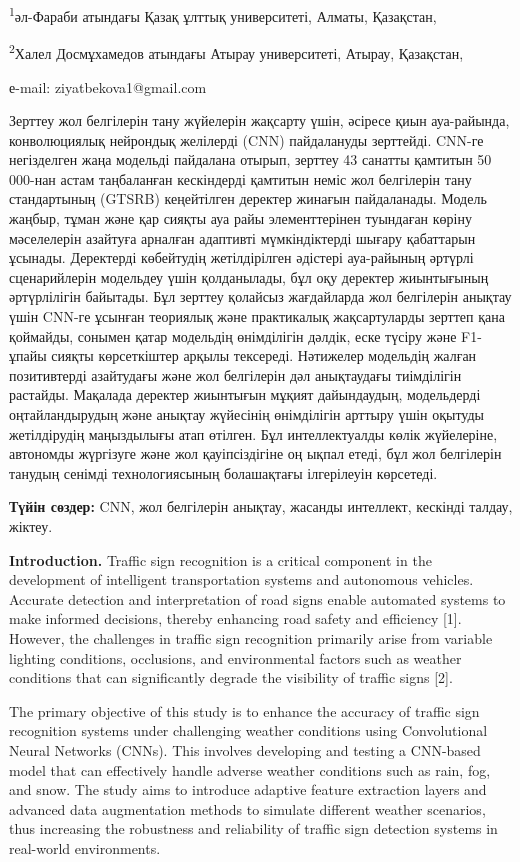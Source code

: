 \textsuperscript{1}әл-Фараби атындағы Қазақ ұлттық университеті, Алматы,
Қазақстан,

\textsuperscript{2}Халел Досмұхамедов атындағы Атырау университеті,
Атырау, Қазақстан,

е-mail: ziyatbekova1@gmail.com

Зерттеу жол белгілерін тану жүйелерін жақсарту үшін, әсіресе қиын
ауа-райында, конволюциялық нейрондық желілерді (CNN) пайдалануды
зерттейді. CNN-ге негізделген жаңа модельді пайдалана отырып, зерттеу 43
санатты қамтитын 50 000-нан астам таңбаланған кескіндерді қамтитын неміс
жол белгілерін тану стандартының (GTSRB) кеңейтілген деректер жинағын
пайдаланады. Модель жаңбыр, тұман және қар сияқты ауа райы
элементтерінен туындаған көріну мәселелерін азайтуға арналған адаптивті
мүмкіндіктерді шығару қабаттарын ұсынады. Деректерді көбейтудің
жетілдірілген әдістері ауа-райының әртүрлі сценарийлерін модельдеу үшін
қолданылады, бұл оқу деректер жиынтығының әртүрлілігін байытады. Бұл
зерттеу қолайсыз жағдайларда жол белгілерін анықтау үшін CNN-ге ұсынған
теориялық және практикалық жақсартуларды зерттеп қана қоймайды, сонымен
қатар модельдің өнімділігін дәлдік, еске түсіру және F1-ұпайы сияқты
көрсеткіштер арқылы тексереді. Нәтижелер модельдің жалған позитивтерді
азайтудағы және жол белгілерін дәл анықтаудағы тиімділігін растайды.
Мақалада деректер жиынтығын мұқият дайындаудың, модельдерді
оңтайландырудың және анықтау жүйесінің өнімділігін арттыру үшін оқытуды
жетілдірудің маңыздылығы атап өтілген. Бұл интеллектуалды көлік
жүйелеріне, автономды жүргізуге және жол қауіпсіздігіне оң ықпал етеді,
бұл жол белгілерін танудың сенімді технологиясының болашақтағы
ілгерілеуін көрсетеді.

{\bfseries Түйін сөздер:} CNN, жол белгілерін анықтау, жасанды интеллект,
кескінді талдау, жіктеу.

{\bfseries Introduction.} Traffic sign recognition is a critical component
in the development of intelligent transportation systems and autonomous
vehicles. Accurate detection and interpretation of road signs enable
automated systems to make informed decisions, thereby enhancing road
safety and efficiency {[}1{]}. However, the challenges in traffic sign
recognition primarily arise from variable lighting conditions,
occlusions, and environmental factors such as weather conditions that
can significantly degrade the visibility of traffic signs {[}2{]}.

The primary objective of this study is to enhance the accuracy of
traffic sign recognition systems under challenging weather conditions
using Convolutional Neural Networks (CNNs). This involves developing and
testing a CNN-based model that can effectively handle adverse weather
conditions such as rain, fog, and snow. The study aims to introduce
adaptive feature extraction layers and advanced data augmentation
methods to simulate different weather scenarios, thus increasing the
robustness and reliability of traffic sign detection systems in
real-world environments.

